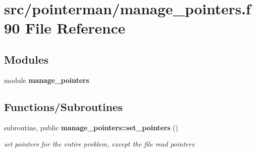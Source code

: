 \section{src/pointerman/manage\+\_\+pointers.f90 File Reference}
\label{manage__pointers_8f90}
\subsection*{Modules}
\begin{DoxyCompactItemize}
\item 
module {\bf manage\+\_\+pointers}
\end{DoxyCompactItemize}
\subsection*{Functions/\+Subroutines}
\begin{DoxyCompactItemize}
\item 
subroutine, public {\bf manage\+\_\+pointers\+::set\+\_\+pointers} ()
\begin{DoxyCompactList}\small\item\em set pointers for the entire problem, except the file read pointers \end{DoxyCompactList}\end{DoxyCompactItemize}
